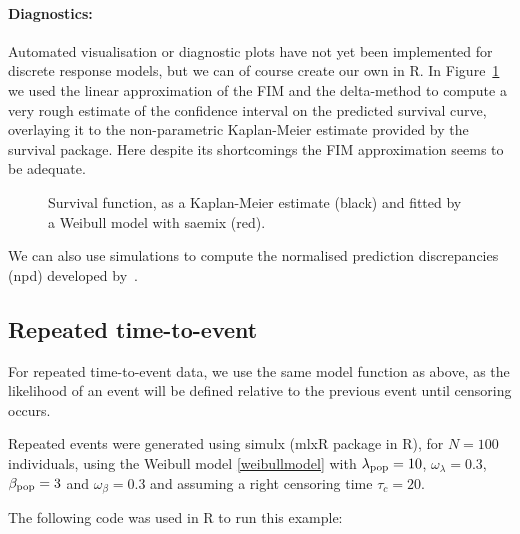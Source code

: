 \paragraph{Diagnostics:} Automated visualisation or diagnostic plots have not yet been implemented for discrete response models, but we can of course create our own in R. In Figure~\ref{fig:lungcompareKM} we used the linear approximation of the FIM and the delta-method to compute a very rough estimate of the confidence interval on the predicted survival curve, overlaying it to the non-parametric Kaplan-Meier estimate provided by the {\sf survival} package. Here despite its shortcomings the FIM approximation seems to be adequate.

\begin{figure}[!h]
\begin{center}
\end{center}
\par \kern -0.5cm
\caption{Survival function, as a Kaplan-Meier estimate (black) and fitted by a Weibull model with {\sf saemix} (red).} \label{fig:lungcompareKM}
\end{figure}

We can also use simulations to compute the normalised prediction discrepancies (npd) developed by~\cite{Cerou18}.

\subsection{Repeated time-to-event}

For repeated time-to-event data, we use the same model function as above, as the likelihood of an event will be defined relative to the previous event until censoring occurs.

Repeated events were generated using simulx (mlxR package in R), for $N=100$ individuals, using the Weibull model \eqref{weibullmodel} with $\lambda_{\rm pop} = 10$, $\omega_{\lambda} = 0.3$, $\beta_{\rm pop} = 3$ and $\omega_{\beta} = 0.3$ and assuming a right censoring time $\tau_c = 20$.

The following code was used in R to run this example:

